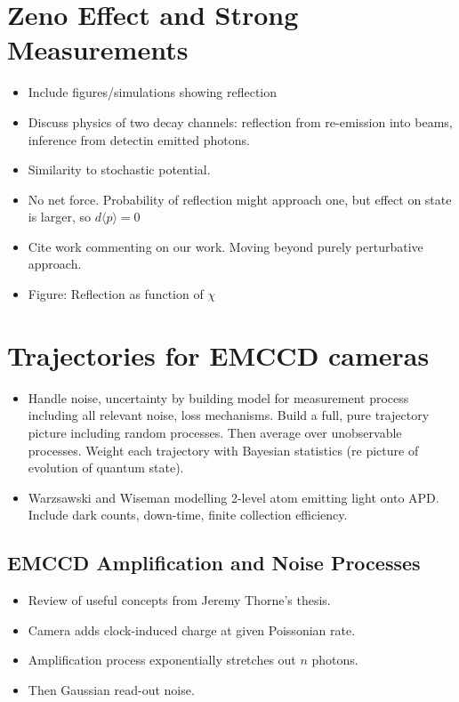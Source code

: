 \section{Zeno Effect and Strong Measurements}

\begin{itemize}
  \item Include figures/simulations showing reflection
  \item Discuss physics of two decay channels: reflection from re-emission into beams, inference from 
    detectin emitted photons.
  \item Similarity to stochastic potential.  
  \item No net force.  Probability of reflection might approach one, but effect on 
    state is larger, so $d\langle p\rangle = 0$
  \item Cite work commenting on our work.  Moving beyond purely perturbative approach.  
  \item Figure: Reflection as function of $\chi$
\end{itemize}

\section{Trajectories for EMCCD cameras}

\begin{itemize}
  \item Handle noise, uncertainty by building model for measurement process
    including all relevant noise, loss mechanisms.  Build a full, pure 
    trajectory picture including random processes.
    Then average over unobservable processes.   Weight each trajectory
    with Bayesian statistics (re picture of evolution of quantum state). 
  \item Warzsawski and Wiseman modelling 2-level atom emitting light onto 
    APD.  Include dark counts, down-time, finite collection efficiency.
\end{itemize}


\subsection{EMCCD Amplification and Noise Processes}

\begin{itemize}
  \item Review of useful concepts from Jeremy Thorne's thesis.  
  \item Camera adds clock-induced charge at given Poissonian rate.
  \item Amplification process exponentially stretches out $n$ photons.
  \item Then Gaussian read-out noise.  
\end{itemize}

